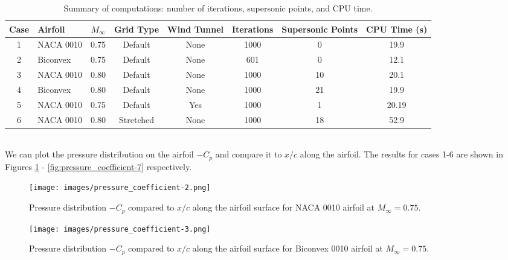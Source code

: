 \begin{table}[h]
    \centering
    \begin{tabular}{c l c c c c c c}
        \hline
        Case & Airfoil & $M_\infty$ & Grid Type & Wind Tunnel & Iterations & Supersonic Points & CPU Time (s) \\
        \hline
        1 & NACA 0010 & 0.75 & Default & None & 1000 & 0 & 19.9 \\
        2 & Biconvex & 0.75 & Default & None & 601 & 0 & 12.1 \\
        3 & NACA 0010 & 0.80 & Default & None & 1000 & 10 & 20.1 \\
        4 & Biconvex & 0.80 & Default & None & 1000 & 21 & 19.9 \\
        5 & NACA 0010 & 0.75 & Default & Yes & 1000 & 1 & 20.19 \\
        6 & NACA 0010 & 0.80 & Stretched & None & 1000 & 18 & 52.9 \\
        \hline
    \end{tabular}
    \caption{Summary of computations: number of iterations, supersonic points, and CPU time.}
    \label{tab:results}
\end{table}

\vspace{1cm}



\\

We can plot the pressure distribution on the airfoil $-C_p$ and compare it to $x/c$ along the airfoil. The results for cases 1-6 are shown in Figures \ref{fig:pressure_coefficient-2} - \ref{fig:pressure_coefficient-7} respectively.

\begin{figure}
    \centering
    \texttt{[image: images/pressure\_coefficient-2.png]}
    \caption{Pressure distribution $-C_p$ compared to $x/c$ along the airfoil surface for NACA 0010 airfoil at $M_\infty = 0.75$.}
    \label{fig:pressure_coefficient-2}
\end{figure}

\begin{figure}
    \centering
    \texttt{[image: images/pressure\_coefficient-3.png]}
    \caption{Pressure distribution $-C_p$ compared to $x/c$ along the airfoil surface for Biconvex 0010 airfoil at $M_\infty = 0.75$.}
    \label{fig:pressure_coefficient-3}
\end{figure}

